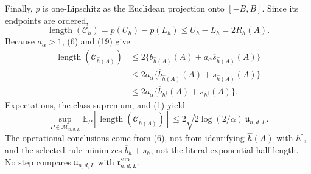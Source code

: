 Finally, \(p\) is one-Lipschitz as the Euclidean projection onto \([-B,B]\).  Since its endpoints are ordered,
\[
 \operatorname{length}(\mathcal C_h)
 =p(U_h)-p(L_h)\leq U_h-L_h=2R_h(A).
\tag{19}
\]
Because \(a_\alpha>1\), (6) and (19) give
\[
\begin{aligned}
 \operatorname{length}(\mathcal C_{\widehat h(A)})
 &\leq2\{\overline b_{\widehat h(A)}(A)+a_\alpha\overline s_{\widehat h(A)}(A)\}\\
 &\leq2a_\alpha\{\overline b_{\widehat h(A)}(A)+\overline s_{\widehat h(A)}(A)\}\\
 &\leq2a_\alpha\{\overline b_{h^\dagger}(A)+\overline s_{h^\dagger}(A)\}.
\end{aligned}
\tag{20}
\]
Expectations, the class supremum, and (1) yield
\[
 \sup_{P\in\mathcal M_{n,d,L}}
 \mathbb E_P[\operatorname{length}(\mathcal C_{\widehat h(A)})]
 \leq2\sqrt{2\log(2/\alpha)}\,\mathfrak u_{n,d,L}.
\tag{21}
\]
The operational conclusions come from (6), not from identifying \(\widehat h(A)\) with \(h^\dagger\), and the selected rule minimizes \(\overline b_h+\overline s_h\), not the literal exponential half-length.  No step compares \(\mathfrak u_{n,d,L}\) with \(\mathfrak r^{\mathrm{sup}}_{n,d,L}\).